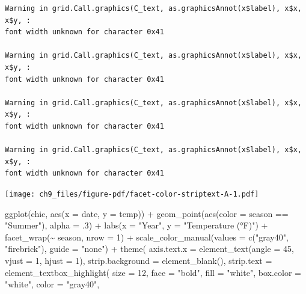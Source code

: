 \documentclass[
  letterpaper,
  DIV=11,
  numbers=noendperiod]{scrreprt}
\newenvironment{Shaded}{\begin{snugshade}}{\end{snugshade}}
\newcommand{\AttributeTok}[1]{\textcolor[rgb]{0.40,0.45,0.13}{#1}}
\newcommand{\DecValTok}[1]{\textcolor[rgb]{0.68,0.00,0.00}{#1}}
\newcommand{\FunctionTok}[1]{\textcolor[rgb]{0.28,0.35,0.67}{#1}}
\newcommand{\NormalTok}[1]{\textcolor[rgb]{0.00,0.23,0.31}{#1}}
\newcommand{\SpecialCharTok}[1]{\textcolor[rgb]{0.37,0.37,0.37}{#1}}
\newcommand{\StringTok}[1]{\textcolor[rgb]{0.13,0.47,0.30}{#1}}
\begin{document}
\begin{verbatim}
Warning in grid.Call.graphics(C_text, as.graphicsAnnot(x$label), x$x, x$y, :
font width unknown for character 0x41

Warning in grid.Call.graphics(C_text, as.graphicsAnnot(x$label), x$x, x$y, :
font width unknown for character 0x41

Warning in grid.Call.graphics(C_text, as.graphicsAnnot(x$label), x$x, x$y, :
font width unknown for character 0x41

Warning in grid.Call.graphics(C_text, as.graphicsAnnot(x$label), x$x, x$y, :
font width unknown for character 0x41
\end{verbatim}

\texttt{[image: ch9\_files/figure-pdf/facet-color-striptext-A-1.pdf]}

\begin{Shaded}
\begin{Highlighting}[]
\FunctionTok{ggplot}\NormalTok{(chic, }\FunctionTok{aes}\NormalTok{(}\AttributeTok{x =}\NormalTok{ date, }\AttributeTok{y =}\NormalTok{ temp)) }\SpecialCharTok{+}
  \FunctionTok{geom\_point}\NormalTok{(}\FunctionTok{aes}\NormalTok{(}\AttributeTok{color =}\NormalTok{ season }\SpecialCharTok{==} \StringTok{"Summer"}\NormalTok{), }\AttributeTok{alpha =}\NormalTok{ .}\DecValTok{3}\NormalTok{) }\SpecialCharTok{+}
  \FunctionTok{labs}\NormalTok{(}\AttributeTok{x =} \StringTok{"Year"}\NormalTok{, }\AttributeTok{y =} \StringTok{"Temperature (°F)"}\NormalTok{) }\SpecialCharTok{+}
  \FunctionTok{facet\_wrap}\NormalTok{(}\SpecialCharTok{\textasciitilde{}}\NormalTok{ season, }\AttributeTok{nrow =} \DecValTok{1}\NormalTok{) }\SpecialCharTok{+}
  \FunctionTok{scale\_color\_manual}\NormalTok{(}\AttributeTok{values =} \FunctionTok{c}\NormalTok{(}\StringTok{"gray40"}\NormalTok{, }\StringTok{"firebrick"}\NormalTok{), }\AttributeTok{guide =} \StringTok{"none"}\NormalTok{) }\SpecialCharTok{+}
  \FunctionTok{theme}\NormalTok{(}
    \AttributeTok{axis.text.x =} \FunctionTok{element\_text}\NormalTok{(}\AttributeTok{angle =} \DecValTok{45}\NormalTok{, }\AttributeTok{vjust =} \DecValTok{1}\NormalTok{, }\AttributeTok{hjust =} \DecValTok{1}\NormalTok{),}
    \AttributeTok{strip.background =} \FunctionTok{element\_blank}\NormalTok{(),}
    \AttributeTok{strip.text =} \FunctionTok{element\_textbox\_highlight}\NormalTok{(}
      \AttributeTok{size =} \DecValTok{12}\NormalTok{, }\AttributeTok{face =} \StringTok{"bold"}\NormalTok{,}
      \AttributeTok{fill =} \StringTok{"white"}\NormalTok{, }\AttributeTok{box.color =} \StringTok{"white"}\NormalTok{, }\AttributeTok{color =} \StringTok{"gray40"}\NormalTok{,}

\end{Highlighting}
\end{Shaded}
\end{document}

